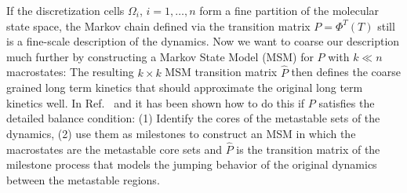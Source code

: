 \documentclass[aps, pre, preprint,unsortedaddress,a4paper,onecolumn]{revtex4}
\newcommand{\vect}[1]{#1}
\newcommand{\myphi}{\Phi}
\begin{document}
If the discretization cells $\Omega_i$, $i=1,\ldots,n$ form a fine
partition of the molecular state space, the Markov chain defined via
the transition matrix $\vect P=\myphi^T(T)$ still is a fine-scale description of the
dynamics.  Now we want to coarse our description much further by
constructing a Markov State Model (MSM) for $\vect P$ with $k\ll n$
macrostates: The resulting $k\times k$ MSM transition matrix $\hat{\vect P}$
then defines the coarse grained long term kinetics that should
approximate the original long term kinetics well. In Ref.~\cite{sarich2010approximation}
and \cite{schuette2011markov} it
has been shown how to do this if $\vect P$ satisfies the detailed balance
condition: (1) Identify the cores of the metastable sets of the
dynamics, (2) use them as milestones to construct an MSM in which the
macrostates are the metastable core sets and $\hat{\vect P}$ is the transition
matrix of the milestone process that models the jumping behavior of
the original dynamics between the metastable regions.
\end{document}
